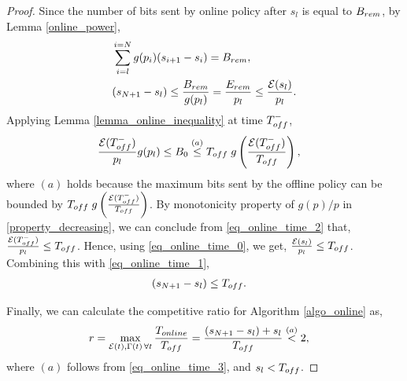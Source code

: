\begin{proof}
Since the number of bits sent by online policy after ${s}_l$ is equal to $B_{\mbox{\scriptsize{rem}}}$, by Lemma \ref{online_power},
\begin{align}
&\sum_{i=l}^{i={N}}g(p_i)({s}_{i+1}-{s}_i)=B_{\mbox{\scriptsize{rem}}},
\\
&({s}_{{N}+1}-{s}_l)\le\frac{B_{\mbox{\scriptsize{rem}}}}{g(p_l)}=\frac{E_{\mbox{\scriptsize{rem}}}}{p_l}\le \frac{\ETx({s}_l)}{p_l}.
\label{eq_online_time_1}  
\end{align}
Applying Lemma \ref{lemma_online_inequality} at time $T_{\mbox{\scriptsize{off}}}^-$,%
\begin{align}
&\frac{\ETx(T_{\mbox{\scriptsize{off}}}^-)}{p_l}g(p_l)\le B_0\stackrel{(a)}{\le}T_{\mbox{\scriptsize{off}}}\; g\left(\frac{\ETx(T_{\mbox{\scriptsize{off}}}^-)}{T_{\mbox{\scriptsize{off}}}}\right),
\label{eq_online_time_2}
\end{align}
where $(a)$ holds because the maximum bits sent by the offline policy can be bounded by $T_{\mbox{\scriptsize{off}}}\; g\left(\frac{\ETx(T_{\mbox{\scriptsize{off}}}^-)}{T_{\mbox{\scriptsize{off}}}}\right)$. By monotonicity property of $g(p)/p$ in \eqref{property_decreasing}, we can conclude from \eqref{eq_online_time_2} that, $\frac{\ETx(T_{\mbox{\scriptsize{off}}}^-)}{p_l}\le T_{\mbox{\scriptsize{off}}}$. Hence, using \eqref{eq_online_time_0}, we get, $\frac{\ETx({s}_l)}{p_l}\le T_{\mbox{\scriptsize{off}}}$. Combining this with \eqref{eq_online_time_1},
\begin{align}
&({s}_{{N}+1}-{s}_l)\le T_{\mbox{\scriptsize{off}}}.
\label{eq_online_time_3}
\end{align} 

Finally, we can calculate the competitive ratio for Algorithm \ref{algo_online} as,
\begin{align*}
&r=\displaystyle\max_{\ETx(t),\TRx(t)\hspace{0.5mm} \forall t}\dfrac{T_{\mbox{\scriptsize{online}}}}{T_{\mbox{\scriptsize{off}}}} = \dfrac{({s}_{{N}+1}-{s}_l)+{s}_l}{T_{\mbox{\scriptsize{off}}}} \stackrel{(a)}{<} 2,
\end{align*}
where $(a)$ follows from \eqref{eq_online_time_3}, and ${s}_l<T_{\mbox{\scriptsize{off}}}$.        
\end{proof}
